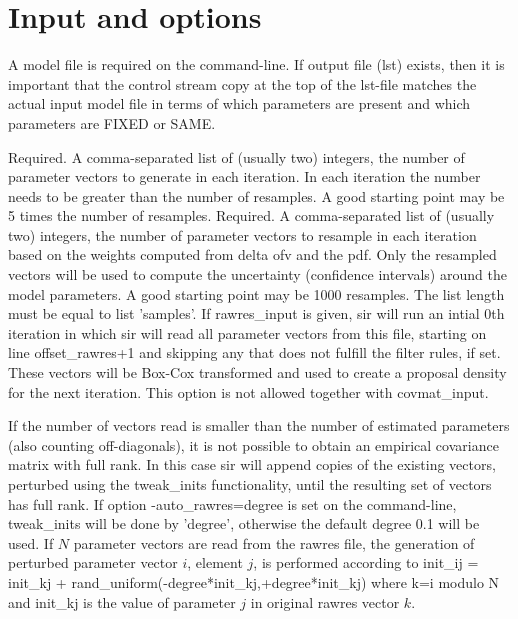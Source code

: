 \section{Input and options}
A model file is required on the command-line. 
If output file (lst) exists, then it is important that the control stream copy at the top of the lst-file matches the actual input model file
in terms of which parameters are present and which parameters are FIXED or SAME.
\begin{optionlist}
Required. A comma-separated list of (usually two) integers, the number of parameter vectors to 
generate in each iteration. In each iteration the number needs to be greater than the number 
of resamples. A good starting point may be 5 times the number of resamples.
\nextopt
{}
Required. A comma-separated list of (usually two) integers, the number of parameter vectors to resample 
in each iteration based on the weights
computed from delta ofv and the pdf. 
Only the resampled vectors will be used to compute the uncertainty (confidence intervals) around the model parameters. 
A good starting point may be 1000 resamples.
The list length must be equal to list 'samples'.
\nextopt
{}
If rawres\_input is given, sir will run an intial 0th iteration in which sir will read all parameter
vectors from this file, starting on line offset\_rawres+1 and skipping any that does not fulfill the filter rules, if set.
These vectors will be Box-Cox transformed and used to create a proposal density for the next iteration.
This option is not allowed together with covmat\_input. 

If the number of vectors read is smaller than 
the number of estimated parameters (also counting off-diagonals),
it is not possible to obtain an empirical covariance matrix with full rank.
In this case sir will append copies of the existing vectors, perturbed using the tweak\_inits
functionality, until the resulting set of vectors has full rank.
If option -auto\_rawres=degree is set on the command-line, tweak\_inits will be done by 'degree',
otherwise the default degree 0.1 will be used.
If $N$ parameter vectors are read from the rawres file,
the generation of perturbed parameter vector $i$, element $j$, is performed according to 
init\_ij = init\_kj + rand\_uniform(-degree*init\_kj,+degree*init\_kj) where k=i modulo N and init\_kj is the value of 
parameter $j$ in original rawres vector $k$. 


\end{optionlist}
